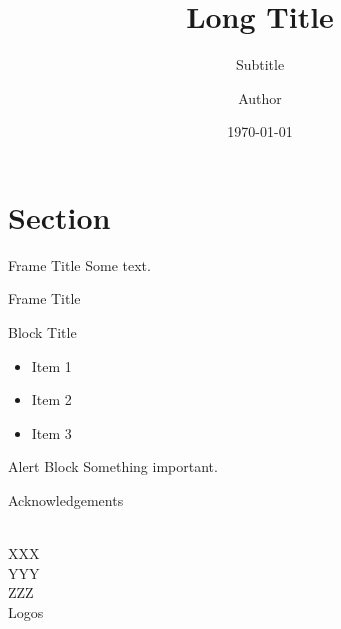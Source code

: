 \documentclass{myBeamer}
\title[Short Title]{Long Title}
\subtitle{Subtitle}
\author[Short Author]{Author}
\date{\today}
\institute{Institut\\
\bigskip
\texttt{[image: figures/logos/openmole.png]}}
\begin{document}
\begin{frame}[plain]
	\titlepage
\end{frame}
\addtocounter{framenumber}{-1}

\AtBeginSection[]
{
	\frame{
		\sectionpage
	}
	\addtocounter{framenumber}{-1}
}


\section{Section}

\begin{frame}{Frame Title\addlogo}
	Some text.
\end{frame}


\begin{frame}{Frame Title}
	\begin{block}{Block Title}
	\begin{itemize}
		\item Item 1
		\item Item 2
		\item Item 3
	\end{itemize}
	\end{block}
	
	\begin{alertblock}{Alert Block}
		Something important.
	\end{alertblock}
\end{frame}


\backupbegin

\appendix
\begin{frame}[plain]{Acknowledgements}
	\begin{center}
	\\
	
	\medskip
	XXX\\
	\medskip
	YYY\\
	\medskip
	ZZZ\\
	
	\bigskip
	Logos
	\end{center}
	
\end{frame}

%

\backupend
\end{document}
